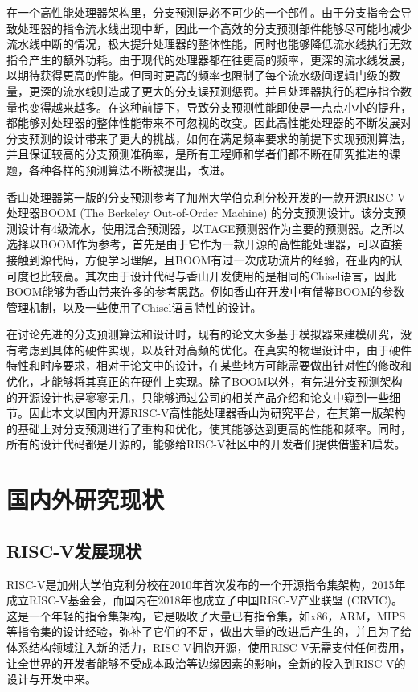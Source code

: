 在一个高性能处理器架构里，分支预测是必不可少的一个部件。由于分支指令会导致处理器的指令流水线出现中断，因此一个高效的分支预测部件能够尽可能地减少流水线中断的情况，极大提升处理器的整体性能，同时也能够降低流水线执行无效指令产生的额外功耗。由于现代的处理器都在往更高的频率，更深的流水线发展，以期待获得更高的性能。但同时更高的频率也限制了每个流水级间逻辑门级的数量，更深的流水线则造成了更大的分支误预测惩罚。并且处理器执行的程序指令数量也变得越来越多。在这种前提下，导致分支预测性能即使是一点点小小的提升，都能够对处理器的整体性能带来不可忽视的改变。因此高性能处理器的不断发展对分支预测的设计带来了更大的挑战\cite{bpu-overview}，如何在满足频率要求的前提下实现预测算法，并且保证较高的分支预测准确率，是所有工程师和学者们都不断在研究推进的课题，各种各样的预测算法不断被提出，改进。

香山处理器第一版的分支预测参考了加州大学伯克利分校开发的一款开源RISC-V处理器BOOM (The Berkeley Out-of-Order Machine) 的分支预测设计\cite{boom-spec}。该分支预测设计有4级流水，使用混合预测器，以TAGE预测器作为主要的预测器。之所以选择以BOOM作为参考，首先是由于它作为一款开源的高性能处理器，可以直接接触到源代码，方便学习理解，且BOOM有过一次成功流片的经验，在业内的认可度也比较高。其次由于设计代码与香山开发使用的是相同的Chisel语言\cite{chisel}，因此BOOM能够为香山带来许多的参考思路。例如香山在开发中有借鉴BOOM的参数管理机制，以及一些使用了Chisel语言特性的设计。

在讨论先进的分支预测算法和设计时，现有的论文大多基于模拟器来建模研究，没有考虑到具体的硬件实现，以及针对高频的优化。在真实的物理设计中，由于硬件特性和时序要求，相对于论文中的设计，在某些地方可能需要做出针对性的修改和优化，才能够将其真正的在硬件上实现。除了BOOM以外，有先进分支预测架构的开源设计也是寥寥无几，只能够通过公司的相关产品介绍和论文中窥到一些细节。因此本文以国内开源RISC-V高性能处理器香山为研究平台，在其第一版架构的基础上对分支预测进行了重构和优化，使其能够达到更高的性能和频率。同时，所有的设计代码都是开源的，能够给RISC-V社区中的开发者们提供借鉴和启发。

\section{国内外研究现状}


\subsection{RISC-V发展现状}
RISC-V是加州大学伯克利分校在2010年首次发布的一个开源指令集架构，2015年成立RISC-V基金会，而国内在2018年也成立了中国RISC-V产业联盟 (CRVIC)。这是一个年轻的指令集架构，它是吸收了大量已有指令集，如x86，ARM，MIPS等指令集的设计经验，弥补了它们的不足，做出大量的改进后产生的，并且为了给体系结构领域注入新的活力，RISC-V拥抱开源，使用RISC-V无需支付任何费用，让全世界的开发者能够不受成本政治等边缘因素的影响，全新的投入到RISC-V的设计与开发中来。

